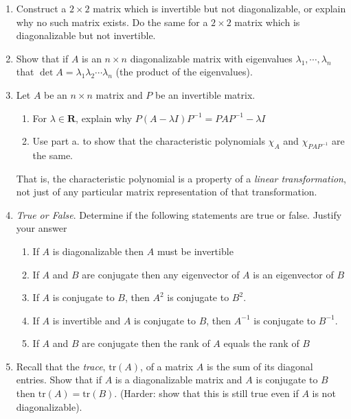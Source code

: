\documentclass[12pt]{article}
\numberwithin{equation}{subsection}
\numberwithin{figure}{subsection}
\theoremstyle{note}
\newcommand{\R}{\mathbf{R}}
\newcommand\tr[1]{\mathrm{tr}(#1)}
\begin{document}
\begin{enumerate}[label=\arabic*.]
	\item Construct a $2\times 2$ matrix which is invertible but not diagonalizable, or explain why no such matrix exists. Do the same for a $2\times 2$ matrix which is diagonalizable but not invertible.
	
	\item Show that if $A$ is an $n\times n$ diagonalizable matrix with eigenvalues $\lambda_1, \cdots, \lambda_n$ that $\det A=\lambda_1 \lambda_2 \cdots \lambda_n$ (the product of the eigenvalues). 
	
	
	
	\item Let $A$ be an $n\times n$ matrix and $P$ be an invertible matrix. 
	\begin{enumerate}
		\item For $\lambda\in\R$, explain why $P(A-\lambda I)P^{-1}=PAP^{-1}-\lambda I$ 
		\item Use part a. to show that the characteristic polynomials  $\chi_A$ and $\chi_{PAP^{-1}}$ are the same. 	
	\end{enumerate}
	That is, the characteristic polynomial is a property of a \textit{linear transformation}, not just of any particular matrix representation of that transformation. 
	
		\item \textit{True or False}. Determine if the following statements are true or false. Justify your answer
		
		\begin{enumerate}
			\item If $A$ is diagonalizable then $A$ must be invertible
			\item If $A$ and $B$ are conjugate then any eigenvector of $A$ is an eigenvector of $B$
			\item If $A$ is conjugate to $B$, then $A^2$ is conjugate to $B^2$.
			\item If $A$ is invertible and $A$ is conjugate to $B$, then $A^{-1}$ is conjugate to $B^{-1}$.
			\item If $A$ and $B$ are conjugate then the rank of $A$ equals the rank of $B$
		\end{enumerate}
	
	\item Recall that the \textit{trace}, $\tr A$, of a matrix $A$ is the sum of its diagonal entries. Show that if $A$ is a diagonalizable matrix and $A$ is conjugate to $B$ then $\tr{A}=\tr{B}$. (Harder: show that this is still true even if $A$ is not diagonalizable).
	

\end{enumerate}
\end{document}
